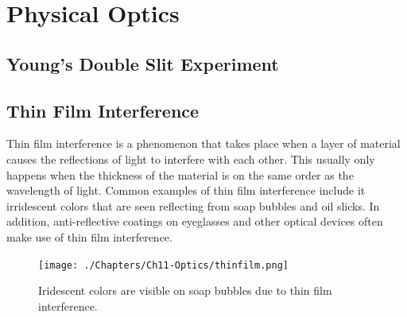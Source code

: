 		
		
	\section{Physical Optics}
		\subsection{Young's Double Slit Experiment}
		
		\newpage
		
		
		\subsection{Thin Film Interference}
		
		Thin film interference is a phenomenon that takes place when a layer of material causes the reflections of light to interfere with each other.  This usually only happens when the thickness of the material is on the same order as the wavelength of light.  Common examples of thin film interference include it irridescent colors that are seen reflecting from soap bubbles and oil slicks.  In addition, anti-reflective coatings on eyeglasses and other optical devices often make use of thin film interference.  
		\begin{figure}[h]		
		\begin{center}
			\texttt{[image: ./Chapters/Ch11-Optics/thinfilm.png]}
		\end{center}
	\caption{Iridescent colors are visible on soap bubbles due to thin film interference.}
	\end{figure}
	

	


